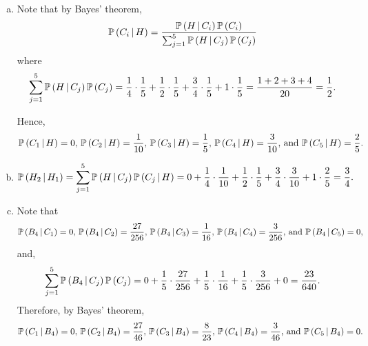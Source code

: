 \begin{ex}
  \begin{enumerate}[(a)]
    \item Note that by Bayes' theorem,
          \[
            \mathbb{P}\left(C_i \,\middle|\, H\right)
            =\frac{\mathbb{P}\left(H \,\middle|\, C_i\right)\mathbb{P}\left(C_i\right)}{\sum_{j=1}^5 \mathbb{P}\left(H \,\middle|\, C_j\right)\mathbb{P}\left(C_j\right)}
          \]
          where
          \[
            \sum_{j=1}^5 \mathbb{P}\left(H \,\middle|\, C_j\right)\mathbb{P}\left(C_j\right)
            =\frac{1}{4}\cdot\frac{1}{5}+\frac{1}{2}\cdot\frac{1}{5}
            +\frac{3}{4}\cdot\frac{1}{5}+1\cdot\frac{1}{5}
            =\frac{1+2+3+4}{20}=\frac{1}{2}.
          \]

          Hence,
          \[
            \mathbb{P}\left(C_1 \,\middle|\, H\right) = 0,\,
            \mathbb{P}\left(C_2 \,\middle|\, H\right) = \frac{1}{10},\,
            \mathbb{P}\left(C_3 \,\middle|\, H\right) = \frac{1}{5},\,
            \mathbb{P}\left(C_4 \,\middle|\, H\right) = \frac{3}{10}\text{, and }
            \mathbb{P}\left(C_5 \,\middle|\, H\right) = \frac{2}{5}.
          \]
    \item
          \[
            \mathbb{P}\left(H_2 \,\middle|\, H_1\right)
            =\sum_{j=1}^5\mathbb{P}\left(H \,\middle|\, C_j\right)\mathbb{P}\left(C_j \,\middle|\, H\right)
            =0+\frac{1}{4}\cdot\frac{1}{10}
            +\frac{1}{2}\cdot\frac{1}{5}
            +\frac{3}{4}\cdot\frac{3}{10}
            +1\cdot\frac{2}{5}=\frac{3}{4}.
          \]
    \item Note that
          \[
            \mathbb{P}\left(B_4 \,\middle|\, C_1\right)=0,\,
            \mathbb{P}\left(B_4 \,\middle|\, C_2\right)=\frac{27}{256},\,
            \mathbb{P}\left(B_4 \,\middle|\, C_3\right)=\frac{1}{16},\,
            \mathbb{P}\left(B_4 \,\middle|\, C_4\right)=\frac{3}{256}\text{, and }
            \mathbb{P}\left(B_4 \,\middle|\, C_5\right)=0,
          \]
          and,
          \[
            \sum_{j=1}^5 \mathbb{P}\left(B_4 \,\middle|\, C_j\right)\mathbb{P}\left(C_j\right)
            =0+\frac{1}{5}\cdot\frac{27}{256}+\frac{1}{5}\cdot\frac{1}{16}
            +\frac{1}{5}\cdot\frac{3}{256}+0
            =\frac{23}{640}.
          \]
          Therefore, by Bayes' theorem,
          \[
            \mathbb{P}\left(C_1 \,\middle|\, B_4\right) = 0,\,
            \mathbb{P}\left(C_2 \,\middle|\, B_4\right) = \frac{27}{46},\,
            \mathbb{P}\left(C_3 \,\middle|\, B_4\right) = \frac{8}{23},\,
            \mathbb{P}\left(C_4 \,\middle|\, B_4\right) = \frac{3}{46}\text{, and }
            \mathbb{P}\left(C_5 \,\middle|\, B_4\right) = 0.
          \]
  \end{enumerate}
\end{ex}


